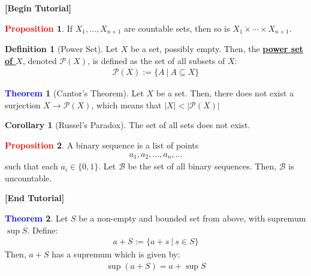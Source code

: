 \documentclass[11pt]{article}
\theoremstyle{definition}
\newcommand{\dfn}[1]{\textbf{{\underline{#1}}}}
\newtheorem{theorem}{\textcolor{blue}{Theorem}}
\newtheorem{corollary}{Corollary}
\theoremstyle{definition}
\newtheorem{definition}{\textcolor{OliveGreen}{Definition}}
\newtheorem{prop}{\textcolor{red}{Proposition}}
\theoremstyle{remark}
\begin{document}
\begin{center}
	\textbf{[Begin Tutorial]}
\end{center}
\begin{prop}
	If $X_1, ..., X_{n+1}$ are countable sets, then so is $X_1 \times \cdots \times X_{n+1}$.
\end{prop}

\begin{definition}[Power Set]
	Let $X$ be a set, possibly empty. Then, the \dfn{power set of $X$}, denoted $\mathcal{P}(X)$, is defined as the set of all subsets of $X$:
	\begin{align}
		\mathcal{P}(X) := \{ A\ |\ A \subseteq X \}	
	\end{align}
\end{definition}

\begin{theorem}[Cantor's Theorem]
	Let $X$ be a set. Then, there does not exist a surjection $X \rightarrow \mathcal{P}(X)$, which means that $|X| < | \mathcal{P}(X) | $
\end{theorem}

\begin{corollary}[Russel's Paradox]
	The set of all sets does not exist.
\end{corollary}

\begin{prop}
	A binary sequence is a list of points
		\begin{align*}
			a_1, a_2, ..., a_n , ...
		\end{align*}
		such that each $a_i \in \{ 0, 1\}$. Let $\mathcal{B}$ be the set of all binary sequences. Then, $\mathcal{B}$ is uncountable.
\end{prop}

\begin{center}
	\textbf{[End Tutorial]}
\end{center}


\begin{theorem}
	Let $S$ be a non-empty and bounded set from above, with supremum $\sup{S} $. Define: 
	\begin{align*}
		a + S := \{ a + s\ |\ s \in S \}
	\end{align*}
	Then, $a+S$ has a supremum which is given by: 
	\begin{align}
		\sup{(a+S)} = a + \sup{S} 	
	\end{align}
\end{theorem}
\end{document}
